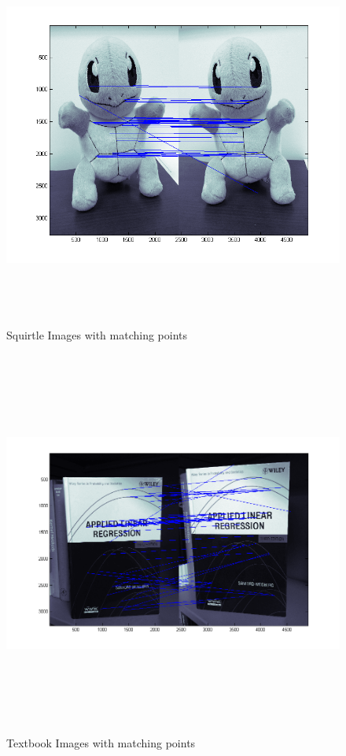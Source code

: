 \documentclass[11pt,psfig]{article}
\begin{document}
\begin{figure}[H]
\centering
\includegraphics[height=5in]{squirtle_prob2Matches2.png}
\caption{Squirtle Images with matching points}
\label{p2d}
\end{figure}

\begin{figure}[H]
\centering
\includegraphics[height=5in]{book_prob2Matches2.png}
\caption{Textbook Images with matching points}
\label{p2e}
\end{figure}
\end{document}
